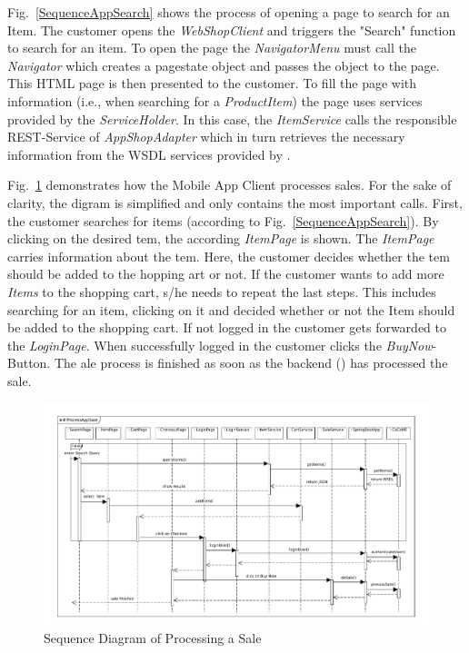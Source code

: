 Fig.~\ref{SequenceAppSearch} shows the process of opening a page to search for an Item. 
The customer opens the \textit{WebShopClient} and triggers the "Search" function to search for an item. 
To open the page the \textit{NavigatorMenu} must call the \textit{Navigator} which creates a pagestate object and passes the object to the page. 
This HTML page is then presented to the customer. 
To fill the page with information (i.e., when searching for a \textit{ProductItem}) the page uses services provided by the \textit{ServiceHolder}. 
In this case, the \textit{ItemService} calls the responsible REST-Service of \textit{AppShopAdapter} which in turn retrieves the necessary information from the WSDL services provided by \CoCoME.

Fig.~\ref{SequenceAppSale} demonstrates how the Mobile App Client processes sales. 
For the sake of clarity, the digram is simplified and only contains the most important calls. 
First, the customer searches for items (according to Fig.~\ref{SequenceAppSearch}). 
By clicking on the desired tem, the according \textit{ItemPage} is shown. 
The \textit{ItemPage} carries information about the tem. 
Here, the customer decides whether the tem should be added to the hopping art or not. 
If the customer wants to add more \textit{Items} to the shopping cart, s/he needs to repeat the last steps. This includes searching for an item, clicking on it and decided whether or not the Item should be added to the shopping cart.
If not logged in the customer gets forwarded to the \textit{LoginPage}. 
When successfully logged in the customer clicks the \textit{BuyNow}-Button. 
The ale process is finished as soon as the backend (\CoCoME) has processed the sale.


\begin{figure}[!h]
	\includegraphics[width=\textwidth]{img/appProcessSale.pdf}
	\caption{Sequence Diagram of Processing a Sale}
	\label{SequenceAppSale}
\end{figure}

